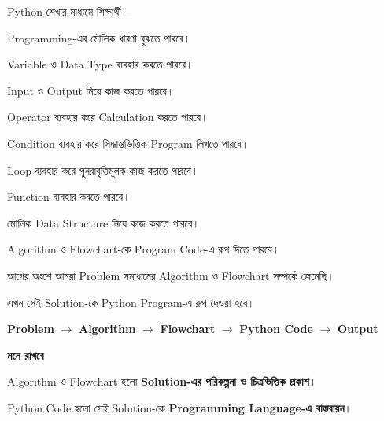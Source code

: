 

Python শেখার মাধ্যমে শিক্ষার্থী—

\begin{compacttwocolpoints}

\item Programming-এর মৌলিক ধারণা বুঝতে পারবে।

\item Variable ও Data Type ব্যবহার করতে পারবে।

\item Input ও Output নিয়ে কাজ করতে পারবে।

\item Operator ব্যবহার করে Calculation করতে পারবে।

\item Condition ব্যবহার করে সিদ্ধান্তভিত্তিক Program লিখতে পারবে।

\item Loop ব্যবহার করে পুনরাবৃত্তিমূলক কাজ করতে পারবে।

\item Function ব্যবহার করতে পারবে।

\item মৌলিক Data Structure নিয়ে কাজ করতে পারবে।

\item Algorithm ও Flowchart-কে Program Code-এ রূপ দিতে পারবে।

\end{compacttwocolpoints}



আগের অংশে আমরা Problem সমাধানের Algorithm ও Flowchart
সম্পর্কে জেনেছি।

এখন সেই Solution-কে Python Program-এ রূপ দেওয়া হবে।

\begin{center}
\textbf{Problem}
\(\longrightarrow\)
\textbf{Algorithm}
\(\longrightarrow\)
\textbf{Flowchart}
\(\longrightarrow\)
\textbf{Python Code}
\(\longrightarrow\)
\textbf{Output}
\end{center}

\begin{rememberbox}

\textbf{\color{deepOrange}মনে রাখবে}

Algorithm ও Flowchart হলো
\textbf{Solution-এর পরিকল্পনা ও চিত্রভিত্তিক প্রকাশ}।

Python Code হলো সেই Solution-কে
\textbf{Programming Language-এ বাস্তবায়ন}।

\end{rememberbox}

